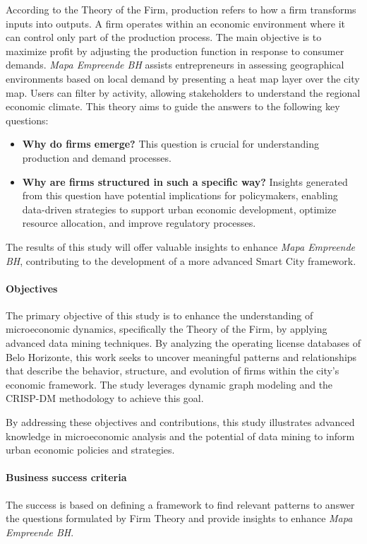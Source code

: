 \documentclass[12pt]{article}
\begin{document}
According to the Theory of the Firm, production refers to how a firm transforms inputs into outputs. A firm operates within an economic environment where it can control only part of the production process. The main objective is to maximize profit by adjusting the production function in response to consumer demands. \textit{Mapa Empreende BH} assists entrepreneurs in assessing geographical environments based on local demand by presenting a heat map layer over the city map. Users can filter by activity, allowing stakeholders to understand the regional economic climate. This theory aims to guide the answers to the following key questions:
\begin{itemize}
    \item \textbf{Why do firms emerge?} This question is crucial for understanding production and demand processes.
    \item \textbf{Why are firms structured in such a specific way?} Insights generated from this question have potential implications for policymakers, enabling data-driven strategies to support urban economic development, optimize resource allocation, and improve regulatory processes.
\end{itemize}
The results of this study will offer valuable insights to enhance \textit{Mapa Empreende BH}, contributing to the development of a more advanced Smart City framework.

\paragraph{Objectives}

The primary objective of this study is to enhance the understanding of microeconomic dynamics, specifically the Theory of the Firm, by applying advanced data mining techniques. By analyzing the operating license databases of Belo Horizonte, this work seeks to uncover meaningful patterns and relationships that describe the behavior, structure, and evolution of firms within the city's economic framework. The study leverages dynamic graph modeling and the CRISP-DM methodology
to achieve this goal.

By addressing these objectives and contributions, this study illustrates advanced knowledge in microeconomic analysis and the potential of data mining to inform urban economic policies and strategies.

\paragraph{Business success criteria}
The success is based on defining a framework to find relevant patterns to answer the questions formulated by Firm Theory and provide insights to enhance \textit{Mapa Empreende BH}.
\end{document}

